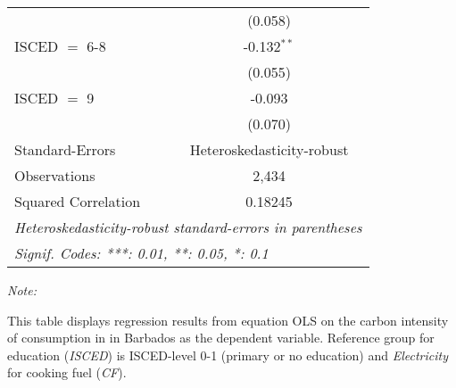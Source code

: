 \begin{table}[htbp!]
\begin{adjustbox}{width = 1\textwidth, max height = 0.95\textheight, center}
\begin{threeparttable}[b]
\begin{tabular}{lc}
                                & (0.058)\\   
            ISCED $=$ 6-8       & -0.132$^{**}$\\   
                                & (0.055)\\   
            ISCED $=$ 9         & -0.093\\   
                                & (0.070)\\   
            \midrule 
            Standard-Errors     & Heteroskedasticity-robust \\   
            Observations        & 2,434\\  
            Squared Correlation & 0.18245\\  
            \midrule \midrule
            \multicolumn{2}{l}{\emph{Heteroskedasticity-robust standard-errors in parentheses}}\\
            \multicolumn{2}{l}{\emph{Signif. Codes: ***: 0.01, **: 0.05, *: 0.1}}\\
         \end{tabular}
         
         \begin{tablenotes}\item \medskip \textit{Note:}
            \item This table displays regression results from equation OLS on the carbon intensity of consumption in  in Barbados as the dependent variable. Reference group for education (\textit{ISCED}) is ISCED-level 0-1 (primary or no education) and \textit{Electricity} for cooking fuel (\textit{CF}).
         \end{tablenotes}
      \end{threeparttable}
   \end{adjustbox}
\end{table}


